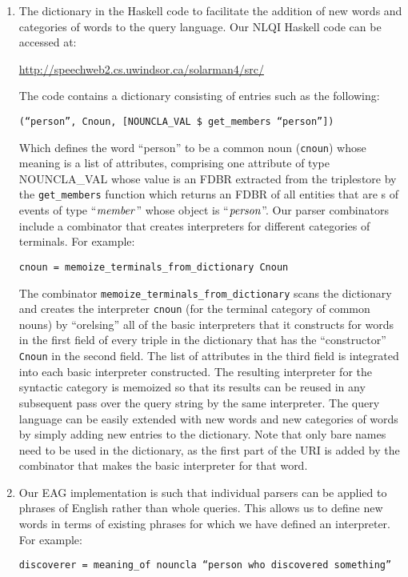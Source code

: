 \documentclass[../main.tex]{subfiles}
\begin{document}
\begin{refsection}
\begin{enumerate}
	\item The dictionary in the Haskell code to facilitate the addition of new words and
	categories of words to the query language. Our NLQI Haskell code can be accessed at:
	\begin{center} \url{http://speechweb2.cs.uwindsor.ca/solarman4/src/} \end{center}
	The code contains a dictionary consisting of entries such as the following:
	\begin{center} \texttt{(``person'', Cnoun, [NOUNCLA\_VAL \$ get\_members ``person''])} \end{center}
	Which defines the word ``person'' to be a common noun (\texttt{cnoun}) whose meaning is a
	list of attributes, comprising one attribute of type NOUNCLA\_VAL whose value is an FDBR extracted from the triplestore by the \texttt{get\_members} function which returns an FDBR of all entities
	that are s of events of type ``$\operatorname{\mathit{member}}$'' whose object is ``$\operatorname{\mathit{person}}$''. Our parser
	combinators include a combinator that creates interpreters for different categories of terminals.
	For example:
	\begin{center} \texttt{cnoun = memoize\_terminals\_from\_dictionary Cnoun} \end{center}
	The combinator \texttt{memoize\_terminals\_from\_dictionary} scans the dictionary and
	creates the interpreter \texttt{cnoun} (for the terminal category of common nouns) by ``orelsing''
	all of the basic interpreters that it constructs for words in the first field of every triple in the
	dictionary that has the ``constructor'' \texttt{Cnoun} in the second field. The list of attributes in the
	third field is integrated into each basic interpreter constructed. The resulting interpreter for the
	syntactic category is memoized so that its results can be reused in any subsequent pass over the
	query string by the same interpreter.
	The query language can be easily extended with new words and new categories of words by
	simply adding new entries to the dictionary.
	Note that only bare names need to be used in the dictionary, as the first part of the URI is added
	by the combinator that makes the basic interpreter for that word.
	\item Our EAG implementation is such that individual parsers can be applied to phrases of English
	rather than whole queries. This allows us to define new words in terms of existing phrases for
	which we have defined an interpreter. For example:
	\begin{center} \texttt{discoverer = meaning\_of nouncla ``person who discovered something''} \end{center}


\end{enumerate}
\end{refsection}
\end{document}
